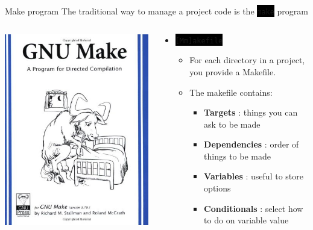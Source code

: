 \documentclass[unknownkeysallowed, 10pt, a4 paper, handout]{beamer}
\newcommand{\code}[1]{\colorbox{black}{\color{green}\texttt{#1}}}
\begin{document}
\begin{frame}[label=makefile]{Make program}
  The traditional way to manage a project code is the \code{make} program
  \begin{columns}[T]
    \begin{column}{.23\textwidth}
      \vspace{30pt}
      \includegraphics[scale=0.25]{pics/GM.jpg}
    \end{column}
    \hfill
    \begin{column}{.76\textwidth}
      \begin{itemize}
        \item \code{[Mm]akefile}
        \begin{itemize}
          \item For each directory in a project, you provide a Makefile.
          \item The makefile contains:
          \begin{itemize}
             \item \textbf{Targets} : things you can ask to be made
             \item \textbf{Dependencies} : order of things to be made
             \item \textbf{Variables} : useful to store options
             \item \textbf{Conditionals} : select how to do on variable value

\end{itemize}
\end{itemize}
\end{itemize}
\end{column}
\end{columns}
\end{frame}
\end{document}
